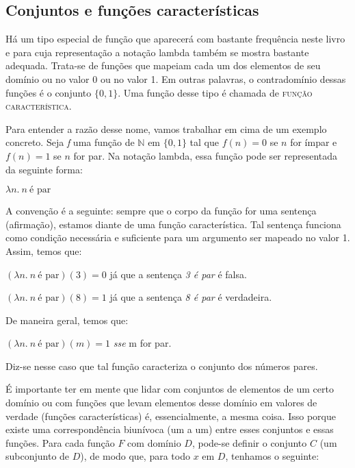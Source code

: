 \subsection{Conjuntos e funções características}

 Há um tipo especial de função que aparecerá com bastante
frequência neste livro e para cuja representação a notação
lambda também se mostra bastante adequada. Trata-se de funções
que mapeiam cada um dos elementos de seu domínio ou no valor 0 ou
no valor 1. Em outras palavras, o contradomínio dessas
funções é o conjunto $\{0,1\}$. Uma função desse tipo é
chamada de \textsc{função característica}. 

Para entender a razão
desse nome, vamos trabalhar em cima de um exemplo concreto. Seja
\textit{f} uma função de $\mathbb{N}$ em $\{0,1\}$ tal que
$f(n)=0$ se $n$ for ímpar e $f(n)=1$ se $n$ for par. Na notação
lambda, essa função pode ser representada da seguinte forma:

\begin{exe}
	\ex $\lambda n.\ n\ \text{é par}$
\end{exe}


\n A convenção é a seguinte: sempre que o corpo da função for uma sentença (afirmação), estamos diante de uma função característica. Tal sentença funciona como condição necessária e suficiente para um argumento ser mapeado no valor 1. Assim, temos que:

\begin{exe}
	\ex $(\lambda n.\ n\ \text{é par})(3) = 0$ já que a sentença \textit{3 é par} é falsa.
\end{exe}

\begin{exe}
	\ex $(\lambda n.\ n\ \text{é par})(8) = 1$ já que a sentença \textit{8 é par} é verdadeira.
\end{exe}

\n De maneira geral, temos que:

\begin{exe}
	\ex $(\lambda n.\ n\ \text{é par})(m) = 1$ \textit{sse} m for par.
\end{exe}
 
\n Diz-se nesse caso que tal função caracteriza o conjunto dos números pares.

É importante ter em mente que lidar com conjuntos de elementos de um certo domínio ou com funções que levam elementos desse domínio em valores de
verdade (funções características) é, essencialmente, a
mesma coisa. Isso porque existe uma correspondência biunívoca (um a um) entre esses conjuntos e essas funções. Para cada função $F$ com domínio $D$, pode-se definir o conjunto $C$ (um subconjunto de $D$),  de modo que, para todo $x$ em $D$, tenhamos o seguinte:

